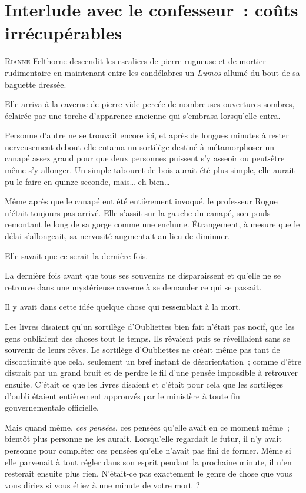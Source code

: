 \chapter{Interlude avec le confesseur~: coûts irrécupérables}

\lettrine{R}{ianne} Felthorne descendit les escaliers de pierre rugueuse et de mortier rudimentaire en maintenant entre les candélabres un \emph{Lumos} allumé du bout de sa baguette dressée.

Elle arriva à la caverne de pierre vide percée de nombreuses ouvertures sombres, éclairée par une torche d'apparence ancienne qui s'embrasa lorsqu'elle entra.

Personne d'autre ne se trouvait encore ici, et après de longues minutes à rester nerveusement debout elle entama un sortilège destiné à métamorphoser un canapé assez grand pour que deux personnes puissent s'y asseoir ou peut-être même s'y allonger. Un simple tabouret de bois aurait été plus simple, elle aurait pu le faire en quinze seconde, mais… eh bien…

Même après que le canapé eut été entièrement invoqué, le professeur Rogue n'était toujours pas arrivé. Elle s'assit sur la gauche du canapé, son pouls remontant le long de sa gorge comme une enclume. Étrangement, à mesure que le délai s'allongeait, sa nervosité augmentait au lieu de diminuer.

Elle savait que ce serait la dernière fois.

La dernière fois avant que tous ses souvenirs ne disparaissent et qu'elle ne se retrouve dans une mystérieuse caverne à se demander ce qui se passait.

Il y avait dans cette idée quelque chose qui ressemblait à la mort.

Les livres disaient qu'un sortilège d'Oubliettes bien fait n'était pas nocif, que les gens oubliaient des choses tout le temps. Ils rêvaient puis se réveillaient sans se souvenir de leurs rêves. Le sortilège d'Oubliettes ne créait même pas tant de discontinuité que cela, seulement un bref instant de désorientation~; comme d'être distrait par un grand bruit et de perdre le fil d'une pensée impossible à retrouver ensuite. C'était ce que les livres disaient et c'était pour cela que les sortilèges d'oubli étaient entièrement approuvés par le ministère à toute fin gouvernementale officielle.

Mais quand même, \emph{ces pensées}, ces pensées qu'elle avait en ce moment même~; bientôt plus personne ne les aurait. Lorsqu'elle regardait le futur, il n'y avait personne pour compléter ces pensées qu'elle n'avait pas fini de former. Même si elle parvenait à tout régler dans son esprit pendant la prochaine minute, il n'en resterait ensuite plus rien. N'était-ce pas exactement le genre de chose que vous vous diriez si vous étiez à une minute de votre mort~?

